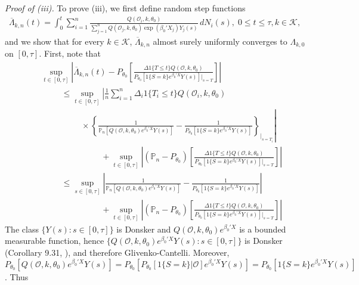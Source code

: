 \documentclass{statsoc}
\begin{document}
\\\\
\textit{Proof of (iii).}
To prove (iii), we first define random step functions
\begin{eqnarray*}
\overline\Lambda_{k,n}(t)=\int_0^t\sum_{i=1}^n \frac{Q(\mathcal O_i,k,\theta_0)}{\sum_{j=1}^n Q(\mathcal O_j,k,\theta_0)\exp(\beta_0'X_j)Y_j(s)}\,dN_i(s),\; 0\leq t\leq \tau, k\in\mathcal K,
\end{eqnarray*}
and we show that for every $k\in\mathcal K$, $\overline\Lambda_{k,n}$ almost surely uniformly converges to $\Lambda_{k,0}$ on $[0,\tau]$. First, note that
\begin{eqnarray}\label{ineq}
&&\sup_{t\in [0,\tau]}\left|\overline\Lambda_{k,n}(t)-P_{\theta_0}\left[\frac{\Delta 1\{T\leq t\}Q(\mathcal O,k,\theta_0)}{P_{\theta_0}\left[1\{S=k\}e^{\beta_0'X}Y(s)\right]\left.\right|_{s=T}}\right]\right|\nonumber\\
&&\hspace{1cm}\leq\sup_{t\in [0,\tau]}\left|\frac{1}{n}\sum_{i=1}^n \Delta_i1\{T_i\leq t\}Q(\mathcal O_i,k,\theta_0)\right.\nonumber\\
&&\left.\hspace{2cm}\times\left\{\frac{1}{\mathbb P_n\left[Q(\mathcal O,k,\theta_0)e^{\beta_0'X}Y(s)\right]}-\frac{1}{P_{\theta_0}\left[1\{S=k\}e^{\beta_0'X}Y(s)\right]}\right\}_{\left.\right|_{s=T_i}}\right|\nonumber\\
&&\hspace{3cm}+\sup_{t\in [0,\tau]}\left|(\mathbb P_n-P_{\theta_0})\left[\frac{\Delta 1\{T\leq t\}Q(\mathcal O,k,\theta_0)}{P_{\theta_0}\left[1\{S=k\}e^{\beta_0'X}Y(s)\right]\left.\right|_{s=T}}\right]\right|\nonumber\\
&&\hspace{1cm}\leq\sup_{s\in [0,\tau]}\left|\frac{1}{\mathbb P_n\left[Q(\mathcal O,k,\theta_0)e^{\beta_0'X}Y(s)\right]}-\frac{1}{P_{\theta_0}\left[1\{S=k\}e^{\beta_0'X}Y(s)\right]}\right|\nonumber\\
&&\hspace{3cm}+\sup_{t\in [0,\tau]}\left|(\mathbb P_n-P_{\theta_0})\left[\frac{\Delta 1\{T\leq t\}Q(\mathcal O,k,\theta_0)}{P_{\theta_0}\left[1\{S=k\}e^{\beta_0'X}Y(s)\right]\left.\right|_{s=T}}\right]\right|
\end{eqnarray}
The class $\{Y(s):s\in [0,\tau]\}$ is Donsker and $Q(\mathcal O,k,\theta_0)e^{\beta_0'X}$ is a bounded measurable function, hence $\{Q(\mathcal O,k,\theta_0)e^{\beta_0'X}Y(s):s\in [0,\tau]\}$ is Donsker (Corollary 9.31, \cite{k07}), and therefore Glivenko-Cantelli. Moreover, $P_{\theta_0}[Q(\mathcal O,k,\theta_0)e^{\beta_0'X}Y(s)]=P_{\theta_0}[P_{\theta_0}[1\{S=k\}|\mathcal O] e^{\beta_0'X}Y(s)]=P_{\theta_0}[1\{S=k\}e^{\beta_0'X}Y(s)]$. Thus
\end{document}

